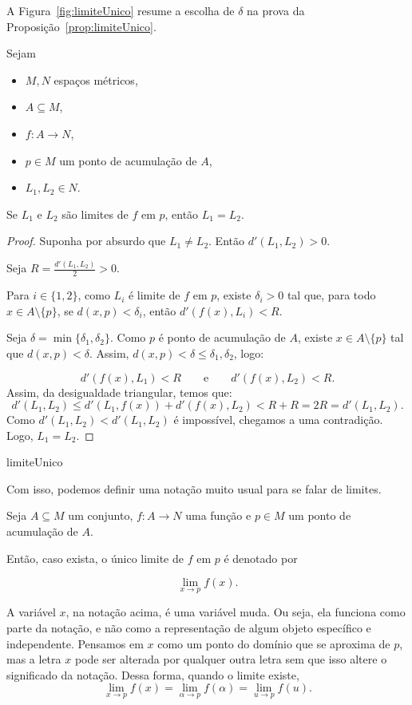 A Figura~\ref{fig:limiteUnico} resume a escolha de $\delta$ na prova da Proposição~\ref{prop:limiteUnico}.

\begin{proposition}\label{prop:limiteUnico}
    Sejam
    \begin{itemize}
        \item $M, N$ espaços métricos,
        \item $A\subseteq M$,
        \item $f: A \to N$,
        \item $p \in M$ um ponto de acumulação de $A$,
        \item $L_1, L_2 \in N$.
    \end{itemize}

    Se $L_1$ e $L_2$ são limites de $f$ em $p$, então $L_1 = L_2$.
\end{proposition}

\begin{proof}
    Suponha por absurdo que $L_1\neq L_2$.
    Então $d'(L_1, L_2) > 0$.

    Seja $R=\frac{d'(L_1, L_2)}{2} > 0$.
    
    Para $i\in \{1, 2\}$, como $L_i$ é limite de $f$ em $p$, existe $\delta_i > 0$ tal que, para todo $x \in A\setminus\{p\}$, se $d(x, p) < \delta_i$, então $d'(f(x), L_i) < R$.

    Seja $\delta = \min\{\delta_1, \delta_2\}$.
    Como $p$ é ponto de acumulação de $A$, existe $x \in A\setminus\{p\}$ tal que $d(x, p) < \delta$.
    Assim, $d(x, p)<\delta\leq \delta_1, \delta_2$, logo:

    \[
        d'(f(x), L_1) < R \qquad\text{e}\qquad d'(f(x), L_2) < R.
    \]
    Assim, da desigualdade triangular, temos que:
    \[
        d'(L_1, L_2) \leq d'(L_1, f(x)) + d'(f(x), L_2) < R + R = 2R = d'(L_1, L_2).
    \]
    Como $d'(L_1, L_2) < d'(L_1, L_2)$ é impossível, chegamos a uma contradição. Logo, $L_1 = L_2$.
\end{proof}


{limiteUnico}

Com isso, podemos definir uma notação muito usual para se falar de limites.
\begin{definition}
    Seja $A\subseteq M$ um conjunto, $f: A \to N$ uma função e $p \in M$ um ponto de acumulação de $A$.

    Então, caso exista, o único limite de $f$ em $p$ é denotado por
    
    \[
    \lim_{x\to p} f(x).
    \]
\end{definition}
A variável $x$, na notação acima, é uma variável muda.
Ou seja, ela funciona como parte da notação, e não como a representação de algum objeto específico e independente.
Pensamos em $x$ como um ponto do domínio que se aproxima de $p$, mas a letra $x$ pode ser alterada por qualquer outra letra sem que isso altere o significado da notação.
Dessa forma, quando o limite existe,
\[
    \lim_{x\to p} f(x) = \lim_{\alpha\to p} f(\alpha) = \lim_{u\to p} f(u).
\]

